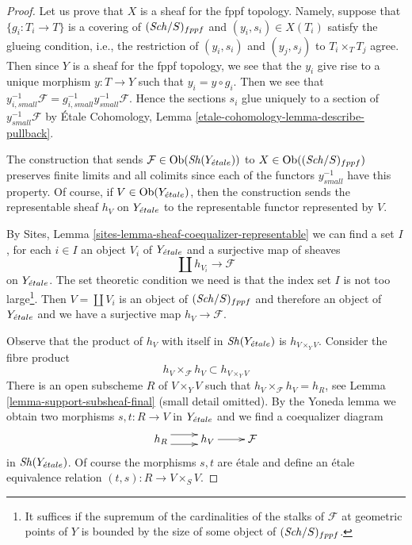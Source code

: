 \begin{proof}
Let us prove that $X$ is a sheaf for the fppf topology. Namely, suppose
that $\{g_i : T_i \to T\}$ is a covering of $(\mathit{Sch}/S)_{fppf}$ and
$(y_i, s_i) \in X(T_i)$ satisfy the glueing condition, i.e., the
restriction of $(y_i, s_i)$ and $(y_j, s_j)$ to $T_i \times_T T_j$ agree.
Then since $Y$ is a sheaf for the fppf topology, we see that
the $y_i$ give rise to a unique morphism $y : T \to Y$ such that
$y_i = y \circ g_i$. Then we see that
$y_{i, small}^{-1}\mathcal{F} = g_{i, small}^{-1}y_{small}^{-1}\mathcal{F}$.
Hence the sections $s_i$ glue uniquely to a section of
$y_{small}^{-1}\mathcal{F}$ by
\'Etale Cohomology, Lemma \ref{etale-cohomology-lemma-describe-pullback}.

\medskip\noindent
The construction that sends $\mathcal{F} \in \mathop{\mathrm{Ob}}\nolimits(\mathop{\mathit{Sh}}\nolimits(Y_{\acute{e}tale}))$
to $X \in \mathop{\mathrm{Ob}}\nolimits((\mathit{Sch}/S)_{fppf})$ preserves finite limits and
all colimits since each of the functors $y_{small}^{-1}$ have
this property. Of course, if $V \in \mathop{\mathrm{Ob}}\nolimits(Y_{\acute{e}tale})$, then
the construction sends the representable sheaf $h_V$ on $Y_{\acute{e}tale}$
to the representable functor represented by $V$.

\medskip\noindent
By Sites, Lemma \ref{sites-lemma-sheaf-coequalizer-representable}
we can find a set $I$, for each $i \in I$ an object $V_i$ of $Y_{\acute{e}tale}$
and a surjective map of sheaves
$$
\coprod h_{V_i} \longrightarrow \mathcal{F}
$$
on $Y_{\acute{e}tale}$. The set theoretic condition we need is that the index
set $I$ is not too large\footnote{It suffices if the supremum of the
cardinalities of the stalks of $\mathcal{F}$ at geometric points of $Y$
is bounded by the size of some object of $(\mathit{Sch}/S)_{fppf}$.}.
Then $V = \coprod V_i$ is an object of $(\mathit{Sch}/S)_{fppf}$ and
therefore an object of $Y_{\acute{e}tale}$ and we have a surjective map
$h_V \to \mathcal{F}$.

\medskip\noindent
Observe that the product of $h_V$ with itself in $\mathop{\mathit{Sh}}\nolimits(Y_{\acute{e}tale})$
is $h_{V \times_Y V}$. Consider the fibre product
$$
h_V \times_\mathcal{F} h_V \subset h_{V \times_Y V}
$$
There is an open subscheme $R$ of $V \times_Y V$ such that
$h_V \times_\mathcal{F} h_V = h_R$, see
Lemma \ref{lemma-support-subsheaf-final} (small detail omitted).
By the Yoneda lemma we obtain two morphisms $s, t : R \to V$ in $Y_{\acute{e}tale}$
and we find a coequalizer diagram
$$
\xymatrix{
h_R \ar@<1ex>[r] \ar@<-1ex>[r] &
h_V \ar[r] &
\mathcal{F}
}
$$
in $\mathop{\mathit{Sh}}\nolimits(Y_{\acute{e}tale})$. Of course the morphisms $s, t$ are \'etale
and define an \'etale equivalence relation $(t, s) : R \to V \times_S V$.


\end{proof}

